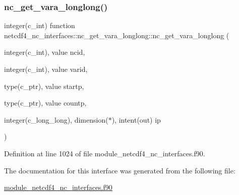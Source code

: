 \subsubsection{\texorpdfstring{nc\+\_\+get\+\_\+vara\+\_\+longlong()}{nc\_get\_vara\_longlong()}}
{\footnotesize\ttfamily integer(c\+\_\+int) function netcdf4\+\_\+nc\+\_\+interfaces\+::nc\+\_\+get\+\_\+vara\+\_\+longlong\+::nc\+\_\+get\+\_\+vara\+\_\+longlong (\begin{DoxyParamCaption}\item[{integer(c\+\_\+int), value}]{ncid,  }\item[{integer(c\+\_\+int), value}]{varid,  }\item[{type(c\+\_\+ptr), value}]{startp,  }\item[{type(c\+\_\+ptr), value}]{countp,  }\item[{integer(c\+\_\+long\+\_\+long), dimension($\ast$), intent(out)}]{ip }\end{DoxyParamCaption})}



Definition at line 1024 of file module\+\_\+netcdf4\+\_\+nc\+\_\+interfaces.\+f90.



The documentation for this interface was generated from the following file\+:\begin{DoxyCompactItemize}
\item 
\hyperlink{module__netcdf4__nc__interfaces_8f90}{module\+\_\+netcdf4\+\_\+nc\+\_\+interfaces.\+f90}\end{DoxyCompactItemize}
